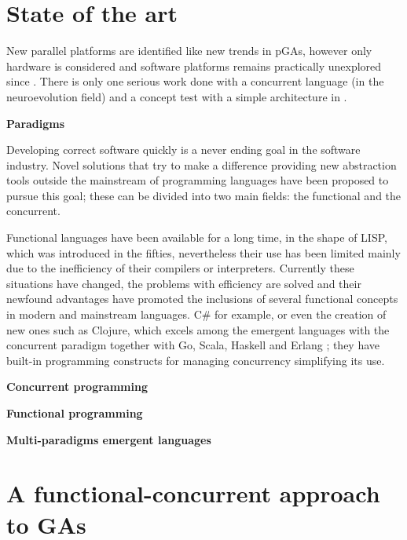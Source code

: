 \documentclass[a4paper]{llncs}
\newcommand{\simpleEntry}[1]
{
\vspace{.3cm}
\noindent \textbf{#1}
\vspace{.3cm}
}
\begin{document}
\section{State of the art}
\label{sec:stateArt}
New parallel platforms are identified like new trends in pGAs\cite{Luque2011}, however only hardware is considered and software platforms remains practically unexplored since \cite{Santos2002}. There is only one serious work \cite{Sher2013} done with a concurrent language (in the neuroevolution field) and a concept test with a simple architecture in \cite{AmandaBienz2011}.

\simpleEntry{Paradigms}
\label{sec:paradigmas}

Developing correct software quickly is a never ending goal in the software industry. Novel solutions that try to make a difference providing new abstraction tools outside the mainstream of programming languages have been proposed to pursue this goal; these can be divided into two main fields: the functional and the concurrent.

Functional languages have been available for a long time, in the shape of LISP, which was introduced in the fifties, nevertheless their use has been limited mainly due to the inefficiency of their compilers or interpreters. Currently these situations have changed, the problems with efficiency are solved and their newfound advantages have promoted the inclusions of several functional concepts in modern and mainstream languages. C\# for example, or even the creation of new ones such as Clojure, which excels among the emergent languages with the concurrent paradigm together with Go, Scala, Haskell and Erlang \cite{DiPierro:2012:CMP}; they have built-in programming constructs for managing concurrency simplifying its use.



\simpleEntry{Concurrent programming}
    

\simpleEntry{Functional programming}
    

\simpleEntry{Multi-paradigms emergent languages}
    

\section{A functional-concurrent approach to GAs}
\label{sec:design}
    
\end{document}
